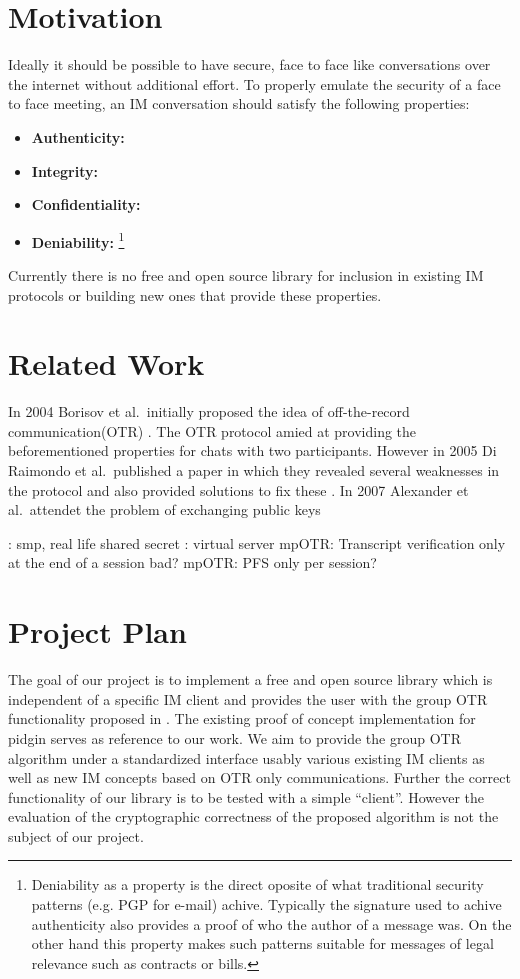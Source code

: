 \section{Motivation}
Ideally it should be possible to have secure, face to face like conversations over the internet without additional effort. To properly emulate the security of a face to face meeting, an IM conversation should satisfy the following properties:
\begin{itemize}
	\item{\textbf{Authenticity:}}
	\item{\textbf{Integrity:}}
	\item{\textbf{Confidentiality:}}
	\item{\textbf{Deniability:} \footnote{Deniability as a property is the direct oposite of what traditional security patterns (e.g. PGP for e-mail) achive. Typically the signature used to achive authenticity also provides a proof of who the author of a message was. On the other hand this property makes such patterns suitable for messages of legal relevance such as contracts or bills.}}
\end{itemize}


Currently there is no free and open source library for inclusion in existing IM protocols or building new ones that provide these properties.

\section{Related Work}
In 2004 Borisov et al.\ initially proposed the idea of off-the-record communication(OTR) \cite{otr}. The OTR protocol amied at providing the beforementioned properties for chats with two participants. However in 2005 Di Raimondo et al.\ published a paper in which they revealed several weaknesses in the protocol and also provided solutions to fix these \cite{sec-otr}. In 2007 Alexander et al.\ attendet the problem of exchanging public keys 

\cite{auth-otr}: smp, real life shared secret
\cite{gotr}: virtual server
mpOTR: Transcript verification only at the end of a session bad?
mpOTR: PFS only per session?

\section{Project Plan}
The goal of our project is to implement a free and open source library which is independent of a specific IM client and provides the user with the group OTR functionality proposed in \cite{impr-gotr}. The existing proof of concept implementation for pidgin serves as reference to our work. We aim to provide the group OTR algorithm under a standardized interface usably various existing IM clients as well as new IM concepts based on OTR only communications. Further the correct functionality of our library is to be tested with a simple ``client''. However the evaluation of the cryptographic correctness of the proposed algorithm is not the subject of our project.

